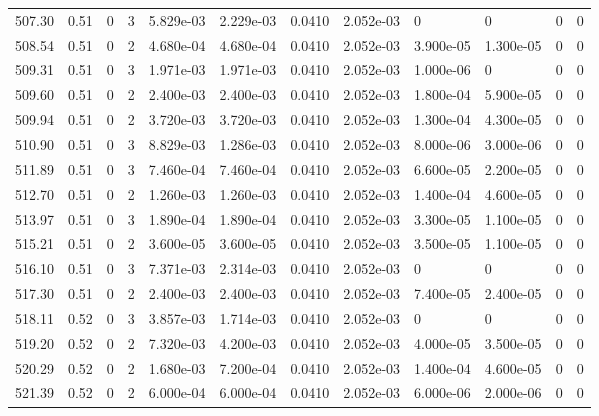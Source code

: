 \documentclass[preview]{standalone}
\begin{document}
{{{{{{{{{{{{{{{{\begin{tabular}{L{1.2cm}C{1.2cm} C{0.3cm}C{0.5cm} C{1.4cm}C{1.4cm} C{1.4cm}C{1.4cm} C{1.6cm}C{1.6cm} C{1.6cm}C{1.6cm}}
  507.30  &  0.51  & 0     &  3 &  5.829e-03  & 2.229e-03  &  0.0410&   2.052e-03& 0 & 0   &  0 & 0  \\ 
  508.54  &  0.51  & 0     &  2 &  4.680e-04  & 4.680e-04  &  0.0410&   2.052e-03& 3.900e-05 & 1.300e-05   &  0 & 0  \\ 
  509.31  &  0.51  & 0     &  3 &  1.971e-03  & 1.971e-03  &  0.0410&   2.052e-03& 1.000e-06 & 0   &  0 & 0  \\ 
  509.60  &  0.51  & 0     &  2 &  2.400e-03  & 2.400e-03  &  0.0410&   2.052e-03& 1.800e-04 & 5.900e-05   &  0 & 0  \\ 
  509.94  &  0.51  & 0     &  2 &  3.720e-03  & 3.720e-03  &  0.0410&   2.052e-03& 1.300e-04 & 4.300e-05   &  0 & 0  \\ 
  510.90  &  0.51  & 0     &  3 &  8.829e-03  & 1.286e-03  &  0.0410&   2.052e-03& 8.000e-06 & 3.000e-06   &  0 & 0  \\ 
  511.89  &  0.51  & 0     &  3 &  7.460e-04  & 7.460e-04  &  0.0410&   2.052e-03& 6.600e-05 & 2.200e-05   &  0 & 0  \\ 
  512.70  &  0.51  & 0     &  2 &  1.260e-03  & 1.260e-03  &  0.0410&   2.052e-03& 1.400e-04 & 4.600e-05   &  0 & 0  \\ 
  513.97  &  0.51  & 0     &  3 &  1.890e-04  & 1.890e-04  &  0.0410&   2.052e-03& 3.300e-05 & 1.100e-05   &  0 & 0  \\ 
  515.21  &  0.51  & 0     &  2 &  3.600e-05  & 3.600e-05  &  0.0410&   2.052e-03& 3.500e-05 & 1.100e-05   &  0 & 0  \\ 
  516.10  &  0.51  & 0     &  3 &  7.371e-03  & 2.314e-03  &  0.0410&   2.052e-03& 0 & 0   &  0 & 0  \\ 
  517.30  &  0.51  & 0     &  2 &  2.400e-03  & 2.400e-03  &  0.0410&   2.052e-03& 7.400e-05 & 2.400e-05   &  0 & 0  \\ 
  518.11  &  0.52  & 0     &  3 &  3.857e-03  & 1.714e-03  &  0.0410&   2.052e-03& 0 & 0   &  0 & 0  \\ 
  519.20  &  0.52  & 0     &  2 &  7.320e-03  & 4.200e-03  &  0.0410&   2.052e-03& 4.000e-05 & 3.500e-05   &  0 & 0  \\ 
  520.29  &  0.52  & 0     &  2 &  1.680e-03  & 7.200e-04  &  0.0410&   2.052e-03& 1.400e-04 & 4.600e-05   &  0 & 0  \\ 
  521.39  &  0.52  & 0     &  2 &  6.000e-04  & 6.000e-04  &  0.0410&   2.052e-03& 6.000e-06 & 2.000e-06   &  0 & 0  \\ 
\hline 
\end{tabular} 

}}}}}}}}}}}}}}}}
\end{document}
